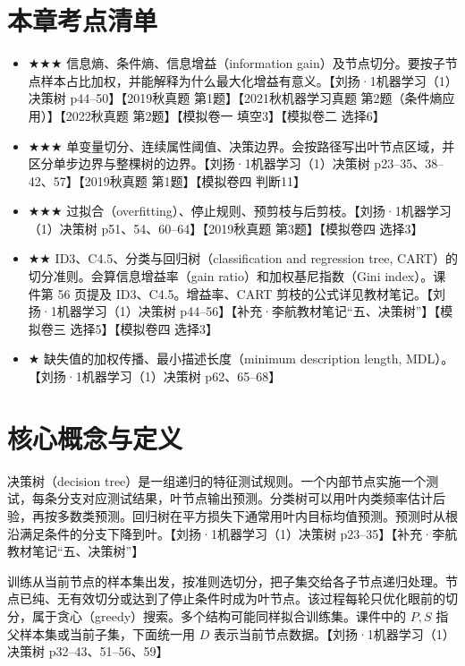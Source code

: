 \documentclass[UTF8,a4paper,zihao=-4,fontset=fandol]{ctexrep}
\begin{document}
\section{本章考点清单}
\begin{itemize}
\item \ensuremath{\bigstar\bigstar\bigstar} 信息熵、条件熵、信息增益（information gain）及节点切分。要按子节点样本占比加权，并能解释为什么最大化增益有意义。【刘扬·1机器学习（1）决策树 p44–50】【2019秋真题 第1题】【2021秋机器学习真题 第2题（条件熵应用）】【2022秋真题 第2题】【模拟卷一 填空3】【模拟卷二 选择6】
\item \ensuremath{\bigstar\bigstar\bigstar} 单变量切分、连续属性阈值、决策边界。会按路径写出叶节点区域，并区分单步边界与整棵树的边界。【刘扬·1机器学习（1）决策树 p23–35、38–42、57】【2019秋真题 第1题】【模拟卷四 判断11】
\item \ensuremath{\bigstar\bigstar\bigstar} 过拟合（overfitting）、停止规则、预剪枝与后剪枝。【刘扬·1机器学习（1）决策树 p51、54、60–64】【2019秋真题 第3题】【模拟卷四 选择3】
\item \ensuremath{\bigstar\bigstar} ID3、C4.5、分类与回归树（classification and regression tree, CART）的切分准则。会算信息增益率（gain ratio）和加权基尼指数（Gini index）。课件第 56 页提及 ID3、C4.5。增益率、CART 剪枝的公式详见教材笔记。【刘扬·1机器学习（1）决策树 p44–56】【补充·李航教材笔记“五、决策树”】【模拟卷三 选择5】【模拟卷四 选择3】
\item \ensuremath{\bigstar} 缺失值的加权传播、最小描述长度（minimum description length, MDL）。【刘扬·1机器学习（1）决策树 p62、65–68】
\end{itemize}

\section{核心概念与定义}
决策树（decision tree）是一组递归的特征测试规则。一个内部节点实施一个测试，每条分支对应测试结果，叶节点输出预测。分类树可以用叶内类频率估计后验，再按多数类预测。回归树在平方损失下通常用叶内目标均值预测。预测时从根沿满足条件的分支下降到叶。【刘扬·1机器学习（1）决策树 p23–35】【补充·李航教材笔记“五、决策树”】

训练从当前节点的样本集出发，按准则选切分，把子集交给各子节点递归处理。节点已纯、无有效切分或达到了停止条件时成为叶节点。该过程每轮只优化眼前的切分，属于贪心（greedy）搜索。多个结构可能同样拟合训练集。课件中的 $P,S$ 指父样本集或当前子集，下面统一用 $D$ 表示当前节点数据。【刘扬·1机器学习（1）决策树 p32–43、51–56、59】
\end{document}
